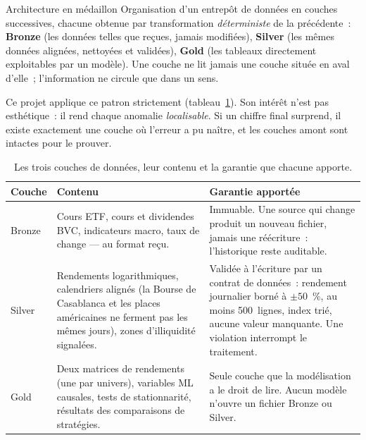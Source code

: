 \begin{definitionbox}{Architecture en médaillon}
Organisation d'un entrepôt de données en couches successives, chacune obtenue par
transformation \emph{déterministe} de la précédente~: \textbf{Bronze} (les données
telles que reçues, jamais modifiées), \textbf{Silver} (les mêmes données
alignées, nettoyées et validées), \textbf{Gold} (les tableaux directement
exploitables par un modèle). Une couche ne lit jamais une couche située en aval
d'elle~; l'information ne circule que dans un sens.
\end{definitionbox}

Ce projet applique ce patron strictement (tableau~\ref{tab:couches}). Son intérêt
n'est pas esthétique~: il rend chaque anomalie \emph{localisable}. Si un chiffre
final surprend, il existe exactement une couche où l'erreur a pu naître, et les
couches amont sont intactes pour le prouver.

\begin{table}[htbp]
  \centering
  \small
  \caption[Les trois couches de données]{Les trois couches de données, leur
  contenu et la garantie que chacune apporte.}
  \label{tab:couches}
  \begin{tabular}{@{}p{2.1cm}p{5.1cm}p{5.4cm}@{}}
    \toprule
    \textbf{Couche} & \textbf{Contenu} & \textbf{Garantie apportée} \\
    \midrule
    Bronze &
    Cours ETF, cours et dividendes BVC, indicateurs macro, taux de change — au
    format reçu. &
    Immuable. Une source qui change produit un nouveau fichier, jamais une
    réécriture~: l'historique reste auditable. \\
    \addlinespace
    Silver &
    Rendements logarithmiques, calendriers alignés (la Bourse de Casablanca et
    les places américaines ne ferment pas les mêmes jours), zones d'illiquidité
    signalées. &
    Validée à l'écriture par un contrat de données~: rendement journalier borné à
    $\pm 50$~\%, au moins 500~lignes, index trié, aucune valeur manquante. Une
    violation interrompt le traitement. \\
    \addlinespace
    Gold &
    Deux matrices de rendements (une par univers), variables ML causales, tests
    de stationnarité, résultats des comparaisons de stratégies. &
    Seule couche que la modélisation a le droit de lire. Aucun modèle n'ouvre un
    fichier Bronze ou Silver. \\
    \bottomrule
  \end{tabular}
\end{table}

